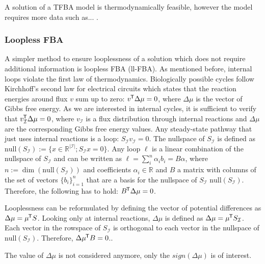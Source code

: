 \cite{noor_removing_2018}


A solution of a TFBA model is thermodynamically feasible, however the model requires more data such as... . 

\subsubsection{Loopless FBA}
A simpler method to ensure looplessness of a solution which does not require additional information is loopless FBA (ll-FBA). As mentioned before, internal loops violate the first law of thermodynamics. Biologically possible cycles follow Kirchhoff's second law for electrical circuits which states that the reaction energies around flux $v$ sum up to zero: $v ^{\mkern-1.5mu\mathsf{T}} \Delta \mu = 0$, where $\Delta \mu$ is the vector of Gibbs free energy. As we are interested in internal cycles, it is sufficient to verify that $v_\mathcal{I} ^{\mkern-1.5mu\mathsf{T}} \Delta \mu =0$, where $v_\mathcal{I}$ is a flux distribution through internal reactions and $\Delta \mu$ are the corresponding Gibbs free energy values.
Any steady-state pathway that just uses internal reactions is a loop: $S_{\mathcal{I}} v_{\mathcal{I}} = 0$. The nullspace of $S_{\mathcal{I}}$ is defined as $\mathrm{null}(S_{\mathcal{I}}) := \{ x \in \mathbb{R}^{|\mathcal{I}|} ; S_{\mathcal{I}}x = 0 \}$.
Any loop $\ell$ is a linear combination of the nullspace of $S_{\mathcal{I}}$ and can be written as $\ell = \sum_i^{n} \alpha_i b_i = B \alpha$, where $n := \dim(\mathrm{null}(S_{\mathcal{I}}))$ and coefficients $\alpha_i \in \mathbb{R}$ and $B$ a matrix with columns of the set of vectors $\{b_i\}_{i=1}^n$ that are a basis for the nullspace of $S_\mathcal{I}$ $\mathrm{null}(S_{\mathcal{I}})$. Therefore, the following has to hold: $B ^{\mkern-1.5mu\mathsf{T}} \Delta \mu = 0$.
\cite{elimination_infeasible_loops}

Looplessness can be reformulated by defining the vector of potential differences as $\Delta \mu = \mu ^{\mkern-1.5mu\mathsf{T}} S$. Looking only at internal reactions, $\Delta \mu$ is defined as $\Delta \mu = \mu ^{\mkern-1.5mu\mathsf{T}} S_\mathcal{I}$.  
Each vector in the rowspace of $S_{\mathcal{I}}$ is orthogonal to each vector in the nullspace of $\mathrm{null}(S_{\mathcal{I}})$. Therefore, $\Delta \mu ^{\mkern-1.5mu\mathsf{T}} B = 0$.\cite{beard_thermodynamic_2004}.


The value of $\Delta \mu$ is not considered anymore, only the $sign(\Delta \mu)$ is of interest.

